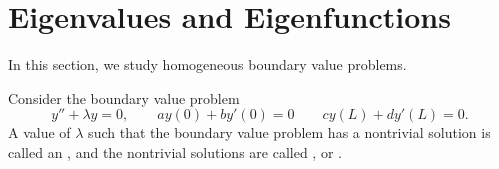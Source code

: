 


\section{Eigenvalues and Eigenfunctions}

In this section, we study homogeneous boundary value problems. 

Consider the boundary value problem
\[
  y''+\lambda y=0, \qquad ay(0)+by'(0)=0 \qquad cy(L)+dy'(L)=0.
\]
A value of $\lambda$ such that the boundary value problem has a nontrivial solution is called an , and the nontrivial solutions are called , or .


